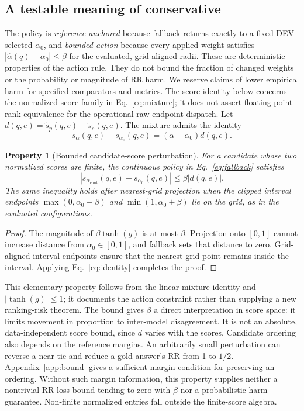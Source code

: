 \documentclass[11pt,a4paper]{article}
\newtheorem{proposition}{Property}
\begin{document}
\subsection{A testable meaning of conservative}
\label{sec:conservative-definition}
The policy is \emph{reference-anchored} because fallback returns exactly to a fixed DEV-selected $\alpha_0$, and \emph{bounded-action} because every applied weight satisfies $|\widehat\alpha(q)-\alpha_0|\leq\beta$ for the evaluated, grid-aligned radii. These are deterministic properties of the action rule. They do not bound the fraction of changed weights or the probability or magnitude of RR harm. We reserve claims of lower empirical harm for specified comparators and metrics.
The score identity below concerns the normalized score family in Eq.~\eqref{eq:mixture}; it does not assert floating-point rank equivalence for the operational raw-endpoint dispatch.
Let $d(q,e)=\widetilde s_p(q,e)-\widetilde s_s(q,e)$. The mixture admits the identity
\begin{equation}
s_\alpha(q,e)-s_{\alpha_0}(q,e)=(\alpha-\alpha_0)d(q,e).
\label{eq:identity}
\end{equation}

\begin{proposition}[Bounded candidate-score perturbation]
For a candidate whose two normalized scores are finite, the continuous policy in Eq.~\eqref{eq:fallback} satisfies
\begin{equation}
\left|s_{\alpha_{\mathrm{cont}}}(q,e)-s_{\alpha_0}(q,e)\right|
\leq\beta|d(q,e)|.
\label{eq:bound}
\end{equation}
The same inequality holds after nearest-grid projection when the clipped interval endpoints $\max(0,\alpha_0-\beta)$ and $\min(1,\alpha_0+\beta)$ lie on the grid, as in the evaluated configurations.
\end{proposition}
\begin{proof}
The magnitude of $\beta\tanh(g)$ is at most $\beta$. Projection onto $[0,1]$ cannot increase distance from $\alpha_0\in[0,1]$, and fallback sets that distance to zero. Grid-aligned interval endpoints ensure that the nearest grid point remains inside the interval. Applying Eq.~\eqref{eq:identity} completes the proof.
\end{proof}

This elementary property follows from the linear-mixture identity and $|\tanh(g)|\leq1$; it documents the action constraint rather than supplying a new ranking-risk theorem. The bound gives $\beta$ a direct interpretation in score space: it limits movement in proportion to inter-model disagreement. It is not an absolute, data-independent score bound, since $d$ varies with the scores. Candidate ordering also depends on the reference margins. An arbitrarily small perturbation can reverse a near tie and reduce a gold answer's RR from 1 to $1/2$. Appendix~\ref{app:bound} gives a sufficient margin condition for preserving an ordering. Without such margin information, this property supplies neither a nontrivial RR-loss bound tending to zero with $\beta$ nor a probabilistic harm guarantee. Non-finite normalized entries fall outside the finite-score algebra.
\end{document}
